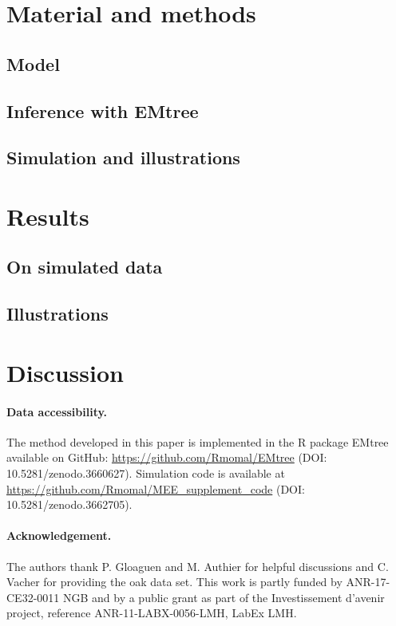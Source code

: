 \documentclass[a4paper,11pt]{article}
\begin{document}
\section{Material and methods}
\subsection{Model} \label{sec:model} 
\subsection{Inference with EMtree} \label{sec:inference} 
\subsection{Simulation and illustrations} 
 
\section{Results}
\subsection{On simulated data}  \label{sec:simul}
\subsection{Illustrations}  \label{sec:illustration}

\section{Discussion} 
\paragraph{Data accessibility.}
The method developed in this paper is implemented in the R package EMtree available on GitHub: \url{https://github.com/Rmomal/EMtree} (DOI: 10.5281/zenodo.3660627). Simulation code is available at \url{https://github.com/Rmomal/MEE\_supplement\_code} (DOI: 10.5281/zenodo.3662705).

\paragraph{Acknowledgement.}
The authors thank P. Gloaguen and M. Authier for helpful discussions and C. Vacher for providing the oak data set. This work is partly funded by ANR-17-CE32-0011 NGB and by a public grant as part of the Investissement d'avenir project, reference ANR-11-LABX-0056-LMH, LabEx LMH.
\end{document}
